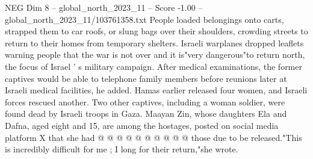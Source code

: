 \begin{textsample}{NEG Dim 8 – global\_north\_2023\_11 – Score -1.00 – global\_north\_2023\_11/103761358.txt}
People loaded belongings onto carts, strapped them to car roofs, or slung bags over their shoulders, crowding streets to return to their homes from temporary shelters.
Israeli warplanes dropped leaflets warning people that the war is not over and it is"very dangerous"to return north, the focus of Israel ' s military campaign.
After medical examinations, the former captives would be able to telephone family members before reunions later at Israeli medical facilities, he added.
Hamas earlier released four women, and Israeli forces rescued another.
Two other captives, including a woman soldier, were found dead by Israeli troops in Gaza.
Maayan Zin, whose daughters Ela and Dafna, aged eight and 15, are among the hostages, posted on social media platform X that she had @ @ @ @ @ @ @ @ @ @ those due to be released."This is incredibly difficult for me ; I long for their return,"she wrote.

\end{textsample}
